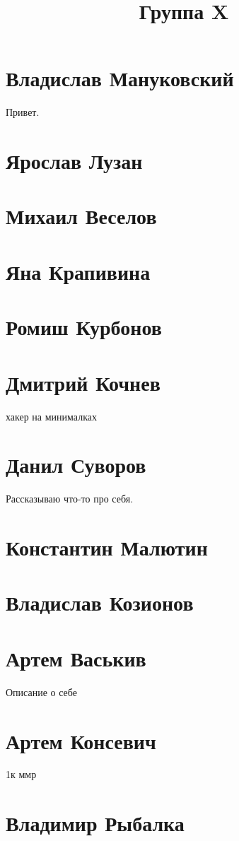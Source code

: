 \documentclass{article}
\title{Группа X}
\begin{document}
\section*{Владислав Мануковский}
Привет.
\section*{Ярослав Лузан}

\section*{Михаил Веселов}

\section*{Яна Крапивина}

\section*{Ромиш Курбонов}

\section*{Дмитрий Кочнев}
хакер на минималках
\section*{Данил Суворов}
Рассказываю что-то про себя.
\section*{Константин Малютин}

\section*{Владислав Козионов}

\section*{Артем Васькив}
Описание о себе
\section*{Артем Консевич}
1к ммр
\section*{Владимир Рыбалка}
\end{document}
